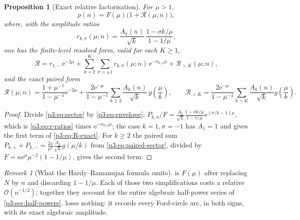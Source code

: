 \documentclass[11pt,a4paper,oneside]{book}
\theoremstyle{plain}
\newtheorem{proposition}[theorem]{Proposition}
\theoremstyle{definition}
\theoremstyle{remark}
\newtheorem{remark}[theorem]{Remark}
\newcommand{\e}{\mathrm{e}}
\newcommand{\bigO}{\mathcal{O}}
\begin{document}
\begin{proposition}[Exact relative factorisation]\label{p3:prop:relative}
For $\mu>1$,
\begin{equation}\label{p3:eq:relative}
 p(n)=F(\mu)\bigl(1+\mathcal{R}(\mu;n)\bigr),
\end{equation}
where, with the amplitude ratios
\begin{equation}\label{p3:eq:r-ratios}
 r_{k,\sigma}(\mu;n)=\frac{A_{k}(n)}{\sqrt k}\,
 \frac{1-\sigma k/\mu}{1-1/\mu},
\end{equation}
one has the finite-level resolved form, valid for each $K\ge1$,
\begin{equation}\label{p3:eq:resolved}
 \mathcal{R}=r_{1,-}\,\e^{-2\mu}
 +\sum_{k=2}^{K}\sum_{\sigma=\pm1}
 r_{k,\sigma}(\mu;n)\,\e^{-\alpha_{k,\sigma}\mu}
 +\mathcal{R}_{>K}(\mu;n),
\end{equation}
and the exact paired form
\begin{equation}\label{p3:eq:R-exact}
 \mathcal{R}(\mu;n)=\frac{1+\mu^{-1}}{1-\mu^{-1}}\e^{-2\mu}
 +\frac{2\e^{-\mu}}{1-\mu^{-1}}
 \sum_{k\ge2}\frac{A_{k}(n)}{\sqrt k}\,g\!\left(\frac\mu k\right),
\qquad
 \mathcal{R}_{>K}=\frac{2\e^{-\mu}}{1-\mu^{-1}}\sum_{k>K}\frac{A_{k}(n)}{\sqrt k}
 g\!\left(\frac\mu k\right).
\end{equation}
\end{proposition}

\begin{proof}
Divide \cref{p3:eq:sector} by \cref{p3:eq:envelope}: $P_{k,\sigma}/F=\frac{A_{k}}{\sqrt
k}\frac{1-\sigma k/\mu}{1-1/\mu} \e^{(\sigma/k-1)\mu}$, which is \cref{p3:eq:r-ratios} times
$\e^{-\alpha_{k,\sigma}\mu}$; the case $k=1,\sigma=-1$ has $A_{1}=1$ and gives the first term of
\cref{p3:eq:R-exact}. For $k\ge2$ the paired sum
$P_{k,+}+P_{k,-}=\frac{2\kappa}{\mu^{2}}\frac{A_{k}}{\sqrt k} g(\mu/k)$ from
\cref{p3:eq:paired-sector}, divided by $F=\kappa\e^{\mu}\mu^{-2}(1-1/\mu)$, gives the second term.
\end{proof}

\begin{remark}[What the Hardy--Ramanujan formula omits]
 is $F(\mu)$ after replacing $N$ by $n$ and discarding $1-1/\mu$. Each of those two
simplifications costs a relative $\bigO(n^{-1/2})$; together they account for the entire
algebraic half-power series of \cref{p3:sec:half-powers}.  loses nothing: it
records every Ford-circle arc, in both signs, with its exact algebraic amplitude.
\end{remark}
\end{document}
